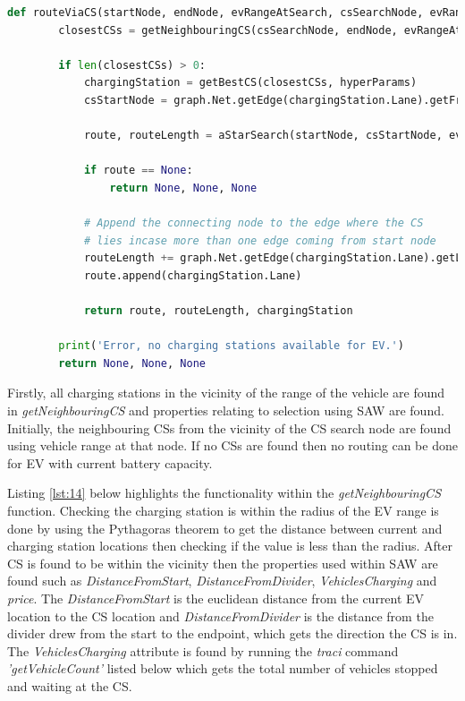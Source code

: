 \documentclass[11pt]{report}
\begin{document}
\begin{lstlisting}[language=Python, caption=Initial call to route via a CS, label={lst:13}]
    def routeViaCS(startNode, endNode, evRangeAtSearch, csSearchNode, evRange, hyperParams):
        closestCSs = getNeighbouringCS(csSearchNode, endNode, evRangeAtSearch)
    
        if len(closestCSs) > 0:
            chargingStation = getBestCS(closestCSs, hyperParams)
            csStartNode = graph.Net.getEdge(chargingStation.Lane).getFromNode().getID()
    
            route, routeLength = aStarSearch(startNode, csStartNode, evRange, True)
    
            if route == None:
                return None, None, None
    
            # Append the connecting node to the edge where the CS
            # lies incase more than one edge coming from start node
            routeLength += graph.Net.getEdge(chargingStation.Lane).getLength()
            route.append(chargingStation.Lane)
    
            return route, routeLength, chargingStation
    
        print('Error, no charging stations available for EV.')
        return None, None, None
\end{lstlisting}
 
Firstly, all charging stations in the vicinity of the range of the vehicle are found in \emph{getNeighbouringCS} and properties relating to selection using SAW are found. Initially, the neighbouring CSs from the vicinity of the CS search node are found using vehicle range at that node. If no CSs are found then no routing can be done for EV with current battery capacity. 

Listing \ref{lst:14} below highlights the functionality within the \emph{getNeighbouringCS} function. Checking the charging station is within the radius of the EV range is done by using the Pythagoras theorem to get the distance between current and charging station locations then checking if the value is less than the radius. After CS is found to be within the vicinity then the properties used within SAW are found such as \emph{DistanceFromStart}, \emph{DistanceFromDivider}, \emph{VehiclesCharging} and \emph{price}. The \emph{DistanceFromStart} is the euclidean distance from the current EV location to the CS location and \emph{DistanceFromDivider} is the distance from the divider drew from the start to the endpoint, which gets the direction the CS is in. The \emph{VehiclesCharging} attribute is found by running the \emph{traci} command \emph{'getVehicleCount'} listed below which gets the total number of vehicles stopped and waiting at the CS.
\end{document}
